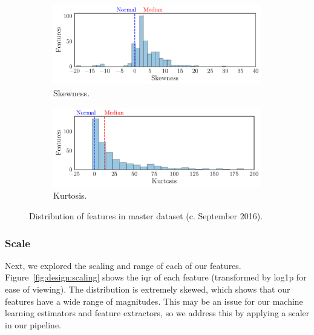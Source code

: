 \documentclass[../thesis/thesis.tex]{subfiles}
\begin{document}
\begin{figure}[!htb]
    \centering
    \begin{subfigure}{\textwidth}
        \includegraphics[width=\textwidth]{../figures/design/distribution_skew}
        \caption[Distribution of skewness by feature]{Skewness.}
        \label{fig:design:normality:skew}
    \end{subfigure}
    \begin{subfigure}{\textwidth}
        \includegraphics[width=\textwidth]{../figures/design/distribution_kurtosis}
        \caption[Distribution of kurtosis by feature]{Kurtosis.}
        \label{fig:design:normality:kurtosis}
    \end{subfigure}
    \caption[Distribution of skewness and kurtosis]{Distribution of features in master dataset (c. September 2016).}
    \label{fig:design:normality}
\end{figure}

\subsubsection{Scale}

Next, we explored the scaling and range of each of our features. Figure~\ref{fig:design:scaling} shows the \gls{iqr} of each feature (transformed by log1p for ease of viewing). The distribution is extremely skewed, which shows that our features have a wide range of magnitudes. This may be an issue for our machine learning estimators and feature extractors, so we address this by applying a scaler in our pipeline.
\end{document}
